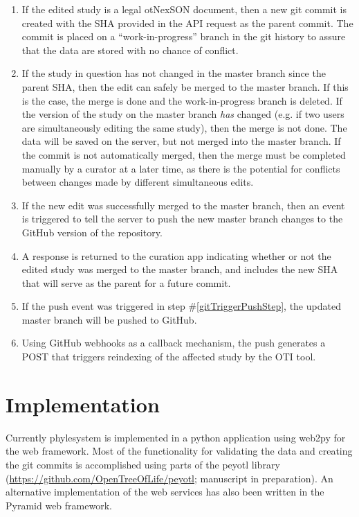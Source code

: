\documentclass{bioinfo}
\newcommand{\ps}{phylesystem\xspace}
\newcommand{\nexson}{otNexSON\xspace}
\begin{document}
\begin{methods}
\begin{enumerate}
    \item \label{gitSaveStep} If the edited study is a legal \nexson document, then a new git commit is created with the SHA
        provided in the API request as the parent commit. The commit is placed on a 
        ``work-in-progress'' branch in the git history to assure that the data are stored with 
        no chance of conflict.
    \item \label{gitMergeStep} If the study in question has not changed in the master branch 
        since the parent SHA, then the edit can safely be merged to the master branch.
        If this is the case, the merge is done and the work-in-progress branch is deleted.
        If the version of the study on the master branch {\em has} changed (e.g. if two users are simultaneously editing the same study),
        then the merge is not done. The data will be saved on the server, but not merged into the master branch.
        If the commit is not automatically merged, then the merge must be completed
        manually by a curator at a later time, 
        as there is the potential for conflicts between changes made by different simultaneous edits.
    \item\label{gitTriggerPushStep} If the new edit was successfully merged to the master branch, then an event is triggered to tell the server to push the new master branch changes to the GitHub version
        of the repository.
    \item\label{respondStep} A response is returned to the curation app indicating whether or not the edited study was 
        merged to the master branch, and includes the new SHA that will serve as the parent for a future commit.
    \item\label{pushStep} If the push event was triggered in step \#\ref{gitTriggerPushStep}, the updated master branch will be pushed to GitHub.
    \item\label{webHookStep} Using GitHub webhooks as a callback mechanism, the push generates a POST that triggers reindexing
        of the affected study by the OTI tool.
\end{enumerate}

\section{Implementation}
Currently \ps is implemented in a python application using web2py for the web framework.
Most of the functionality for validating the data and creating the git commits is accomplished using
    parts of the peyotl library (\url{https://github.com/OpenTreeOfLife/peyotl}; manuscript in preparation).
An alternative implementation of the web services has also been written in the Pyramid
    web framework.


\end{methods}
\end{document}
